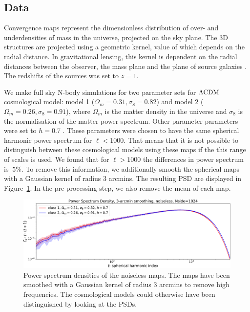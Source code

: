 \documentclass[final,twocolumn,3p,times,authoryear]{elsarticle}
\newcommand{\todo}[1]{{\color[rgb]{.6,.1,.6}{#1}}}
\newcommand{\figref}[1]{Figure~\ref{fig:#1}}
\newcommand{\1}{\b{1}}              %
\newcommand{\0}{\b{0}}              %
\begin{document}
\subsection{Data}
\label{sec:data}

Convergence maps represent the dimensionless distribution of over- and underdensities of mass in the universe, projected on the sky plane.
The 3D structures are projected using a geometric kernel, value of which depends on the radial distance.
In gravitational lensing, this kernel is dependent on the radial distances between the observer, the mass plane and the plane of source galaxies \citep[see][for review of gravitational lensing]{bartelman2010gravitationallensing}.
The redshifts of the sources was set to $z=1$.

We make full sky N-body simulations for two parameter sets for $\Lambda \rm{CDM} $ cosmological model: model 1 ($\Omega_m=0.31, \sigma_8=0.82$) and model 2 ($\Omega_m=0.26, \sigma_8=0.91$), where $\Omega_m$ is the matter density in the universe and $\sigma_8$ is the normalisation of the matter power spectrum.
Other parameter parameters were set to $h=0.7$ \todo{(MORE PARAMS HERE - CHECK WITH RAPHAEL)}.
These parameters were chosen to have the same spherical harmonic power spectrum for $\ell<1000$.
That means that it is not possible to distinguish between these cosmological models using these maps if the this range of scales is used.
We found that for $\ell>1000$ the differences in power spectrum is $~5\%$.
To remove this information, we additionally smooth the spherical maps with a Gaussian kernel of radius $3$ arcmins. The resulting PSD are displayed in \figref{psd_sigma3}. In the pre-processing step, we also remove the mean of each map.

\begin{figure}[!ht]
\centering
\includegraphics[width=\linewidth]{psd_sigma3}
\caption{Power spectrum densities of the noiseless maps. The maps have been smoothed with a Gaussian kernel of radius $3$ arcmins to remove high frequencies. The cosmological models could otherwise have been distinguished by looking at the PSDs.}
\label{fig:psd_sigma3}
\end{figure}
\end{document}
